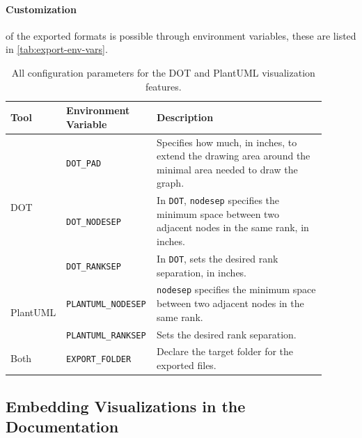 \paragraph{Customization} of the exported formats is possible through environment variables,
these are listed in \autoref{tab:export-env-vars}.

\begin{table}[]
    \centering
    \begin{tabular}{p{0.12\linewidth}|p{0.25\linewidth}|p{0.53\linewidth}}
        Tool                      & Environment Variable       & Description                                                                                                           \\ \hline
        \multirow{3}{*}{DOT}      & \texttt{DOT\_PAD}          & Specifies how much, in inches, to extend the drawing area around the minimal area needed to draw the graph.           \\ \cline{2-3}
                                  & \texttt{DOT\_NODESEP}      & In \texttt{DOT}, \texttt{nodesep} specifies the minimum space between two adjacent nodes in the same rank, in inches. \\ \cline{2-3}
                                  & \texttt{DOT\_RANKSEP}      & In \texttt{DOT}, sets the desired rank separation, in inches.                                                         \\ \hline
        \multirow{2}{*}{PlantUML} & \texttt{PLANTUML\_NODESEP} & \texttt{nodesep} specifies the minimum space between two adjacent nodes in the same rank.                             \\ \cline{2-3}
                                  & \texttt{PLANTUML\_RANKSEP} & Sets the desired rank separation.                                                                                     \\ \hline
        Both                      & \texttt{EXPORT\_FOLDER}    & Declare the target folder for the exported files.
    \end{tabular}
    \caption{All configuration parameters for the DOT and PlantUML visualization features.}
    \label{tab:export-env-vars}
\end{table}

\subsection{Embedding Visualizations in the Documentation}\label{sec:extra-features:documentation-generation}

